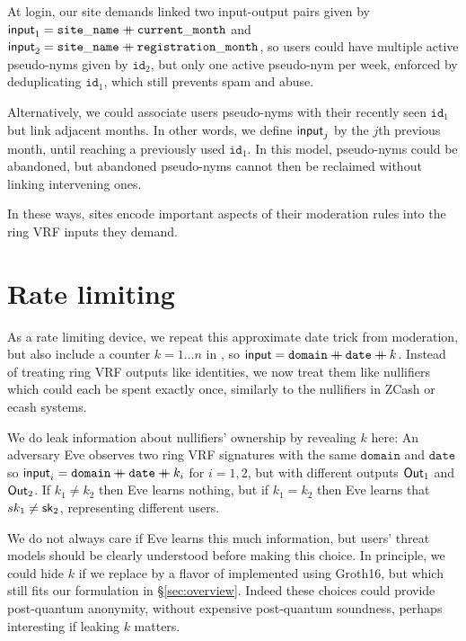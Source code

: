 At login, our site demands linked two input-output pairs given by
$\mathsf{input}_1 = \mathtt{site\_name} \mathbin{+\mkern-10mu+} \mathtt{current\_month}$ and
$\mathsf{input}_2 = \mathtt{site\_name} \mathbin{+\mkern-10mu+} \mathtt{registration\_month}$,
so users could have multiple active pseudo-nyms given by $\mathtt{id}_2$,
but only one active pseudo-nym per week, enforced by deduplicating
$\mathtt{id}_1$, which still prevents spam and abuse.

Alternatively, we could associate users pseudo-nyms with their recently
seen $\mathtt{id}_1$ but link adjacent months.  In other words, we define
$\mathsf{input}_j$ by the $j$th previous month, until reaching a previously used
$\mathtt{id}_1$.  In this model, pseudo-nyms could be abandoned, but
abandoned pseudo-nyms cannot then be reclaimed without linking intervening ones.

In these ways, sites encode important aspects of their moderation rules
into the ring VRF inputs they demand.  


\section{Rate limiting}
\label{sec:app_rate_limits}

As a rate limiting device, we repeat this approximate date trick from
moderation, but also include a counter $k = 1 \ldots n$ in \msg, so
$\mathsf{input} = \mathtt{domain} \mathbin{+\mkern-10mu+} \mathtt{date} \mathbin{+\mkern-10mu+} k$.
Instead of treating ring VRF outputs like identities,
we now treat them like nullifiers which could each be spent exactly once,
similarly to the nullifiers in ZCash or ecash systems.

We do leak information about nullifiers' ownership by revealing $k$ here:
%
An adversary Eve observes two ring VRF signatures with the same
$\mathtt{domain}$ and $\mathtt{date}$ so
$\mathsf{input}_i = \mathtt{domain} \mathbin{+\mkern-10mu+} \mathtt{date} \mathbin{+\mkern-10mu+} k_i$
for $i=1,2$, but with different outputs ${\mathsf{Out}}_1$ and ${\mathsf{Out}}_2$.
If $k_1 \ne k_2$ then Eve learns nothing, but if $k_1 = k_2$ then
Eve learns that $sk_1 \ne \mathsf{sk}_2$, representing different users. 

We do not always care if Eve learns this much information, but users'
threat models should be clearly understood before making this choice.
In principle, we could hide $k$ if we replace \PedVRF by a flavor of
\Reval implemented using Groth16, 
but which still fits our formulation in \S\ref{sec:overview}.
Indeed these \Reval choices could provide post-quantum anonymity, 
without expensive post-quantum soundness, perhaps interesting if leaking $k$ matters.



